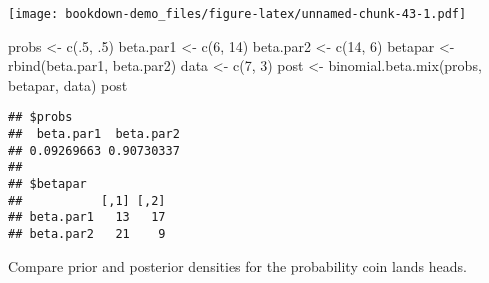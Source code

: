 \documentclass[
]{book}
\newenvironment{Shaded}{\begin{snugshade}}{\end{snugshade}}
\newcommand{\AttributeTok}[1]{\textcolor[rgb]{0.77,0.63,0.00}{#1}}
\newcommand{\ConstantTok}[1]{\textcolor[rgb]{0.00,0.00,0.00}{#1}}
\newcommand{\DecValTok}[1]{\textcolor[rgb]{0.00,0.00,0.81}{#1}}
\newcommand{\FunctionTok}[1]{\textcolor[rgb]{0.00,0.00,0.00}{#1}}
\newcommand{\NormalTok}[1]{#1}
\newcommand{\OtherTok}[1]{\textcolor[rgb]{0.56,0.35,0.01}{#1}}
\newcommand{\SpecialCharTok}[1]{\textcolor[rgb]{0.00,0.00,0.00}{#1}}
\newcommand{\StringTok}[1]{\textcolor[rgb]{0.31,0.60,0.02}{#1}}
\begin{document}
\texttt{[image: bookdown-demo\_files/figure-latex/unnamed-chunk-43-1.pdf]}

\begin{Shaded}
\begin{Highlighting}[]
\NormalTok{probs }\OtherTok{\textless{}{-}} \FunctionTok{c}\NormalTok{(.}\DecValTok{5}\NormalTok{, .}\DecValTok{5}\NormalTok{)}
\NormalTok{beta.par1 }\OtherTok{\textless{}{-}} \FunctionTok{c}\NormalTok{(}\DecValTok{6}\NormalTok{, }\DecValTok{14}\NormalTok{)}
\NormalTok{beta.par2 }\OtherTok{\textless{}{-}} \FunctionTok{c}\NormalTok{(}\DecValTok{14}\NormalTok{, }\DecValTok{6}\NormalTok{)}
\NormalTok{betapar }\OtherTok{\textless{}{-}} \FunctionTok{rbind}\NormalTok{(beta.par1, beta.par2)}
\NormalTok{data }\OtherTok{\textless{}{-}} \FunctionTok{c}\NormalTok{(}\DecValTok{7}\NormalTok{, }\DecValTok{3}\NormalTok{)}
\NormalTok{post }\OtherTok{\textless{}{-}} \FunctionTok{binomial.beta.mix}\NormalTok{(probs, betapar, data)}
\NormalTok{post}
\end{Highlighting}
\end{Shaded}

\begin{verbatim}
## $probs
##  beta.par1  beta.par2 
## 0.09269663 0.90730337 
## 
## $betapar
##           [,1] [,2]
## beta.par1   13   17
## beta.par2   21    9
\end{verbatim}

Compare prior and posterior densities for the probability coin lands heads.

\begin{Shaded}
\end{Shaded}
\end{document}
